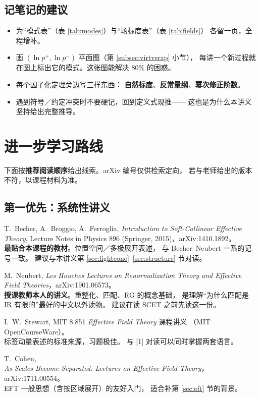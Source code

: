 \documentclass[UTF8,a4paper,11pt]{ctexart}
\theoremstyle{definition}
\theoremstyle{remark}
\theoremstyle{plain}
\begin{document}
\subsection{记笔记的建议}

\begin{itemize}
  \item 为“模式表”（表 \ref{tab:modes}）与“场标度表”（表 \ref{tab:fields}）
        各留一页，全程增补。
  \item 画 $(\ln p^+,\ln p^-)$ 平面图（第 \ref{subsec:virtvsrap} 小节），
        每讲一个新过程就在图上标出它的模式。这张图能解决 80\% 的困惑。
  \item 每个因子化定理旁边写三样东西：
        \textbf{自然标度}、\textbf{反常量纲}、\textbf{幂次修正阶数}。
  \item 遇到符号／约定冲突时不要硬记，回到定义式现推——
        这也是为什么本讲义坚持给出完整推导。
\end{itemize}

\section{进一步学习路线}
\label{sec:further}

下面按\textbf{推荐阅读顺序}给出线索。arXiv 编号仅供检索定向，
若与老师给出的版本不符，以课程材料为准。

\subsection{第一优先：系统性讲义}

\begin{enumerate}[label=\textbf{[\arabic*]}, leftmargin=1.3cm]
\item T.~Becher, A.~Broggio, A.~Ferroglia,
      \emph{Introduction to Soft-Collinear Effective Theory},
      Lecture Notes in Physics 896 (Springer, 2015)，arXiv:1410.1892。\\
      \textbf{最贴合本课程的教材}。位置空间／多极展开表述，
      与 Becher--Neubert 一系的记号一致。
      建议与本讲义第 \ref{sec:lightcone}--\ref{sec:structure} 节对读。
\item M.~Neubert,
      \emph{Les Houches Lectures on Renormalization Theory and
      Effective Field Theories}，arXiv:1901.06573。\\
      \textbf{授课教师本人的讲义}。重整化、匹配、RG 的概念基础，
      是理解“为什么匹配是 IR 有限的”最好的中文以外读物。
      建议在读 SCET 之前先读这一份。
\item I.~W.~Stewart, MIT 8.851 \emph{Effective Field Theory} 课程讲义
      （MIT OpenCourseWare）。\\
      标签动量表述的标准来源，习题极佳。
      与 [1] 对读可以同时掌握两套语言。
\item T.~Cohen,\\
      \emph{As Scales Become Separated: Lectures on Effective Field Theory}，
      arXiv:1711.00554。\\
      EFT 一般思想（含按区域展开）的友好入门，
      适合补第 \ref{sec:eft} 节的背景。
\end{enumerate}
\end{document}
